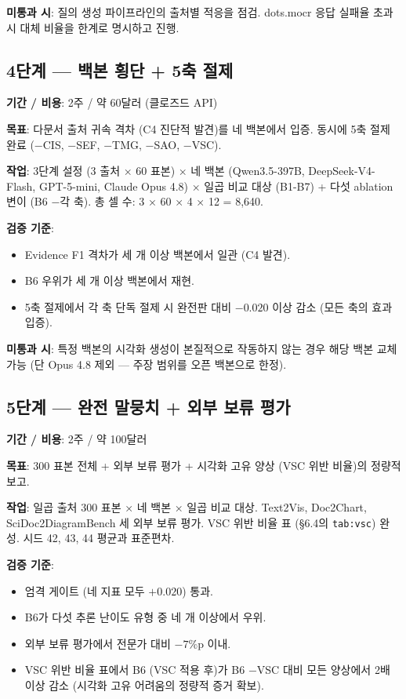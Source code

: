 \documentclass[11pt]{article}
\begin{document}
\textbf{미통과 시}: 질의 생성 파이프라인의 출처별 적응을 점검. dots.mocr 응답 실패율 초과 시 대체 비율을 한계로 명시하고 진행.

\subsection{4단계 — 백본 횡단 + 5축 절제}

\textbf{기간 / 비용}: 2주 / 약 60달러 (클로즈드 API)

\textbf{목표}: 다문서 출처 귀속 격차 (C4 진단적 발견)를 네 백본에서 입증. 동시에 5축 절제 완료 (−CIS, −SEF, −TMG, −SAO, −VSC).

\textbf{작업}: 3단계 설정 (3 출처 × 60 표본) × 네 백본 (Qwen3.5-397B, DeepSeek-V4-Flash, GPT-5-mini, Claude Opus 4.8) × 일곱 비교 대상 (B1-B7) + 다섯 ablation 변이 (B6 −각 축). 총 셀 수: 3 × 60 × 4 × 12 = 8,640.

\textbf{검증 기준}:
\begin{itemize}[leftmargin=*]
    \item Evidence F1 격차가 세 개 이상 백본에서 일관 (C4 발견).
    \item B6 우위가 세 개 이상 백본에서 재현.
    \item 5축 절제에서 각 축 단독 절제 시 완전판 대비 $-0.020$ 이상 감소 (모든 축의 효과 입증).
\end{itemize}

\textbf{미통과 시}: 특정 백본의 시각화 생성이 본질적으로 작동하지 않는 경우 해당 백본 교체 가능 (단 Opus 4.8 제외 — 주장 범위를 오픈 백본으로 한정).

\subsection{5단계 — 완전 말뭉치 + 외부 보류 평가}

\textbf{기간 / 비용}: 2주 / 약 100달러

\textbf{목표}: 300 표본 전체 + 외부 보류 평가 + 시각화 고유 양상 (VSC 위반 비율)의 정량적 보고.

\textbf{작업}: 일곱 출처 300 표본 × 네 백본 × 일곱 비교 대상. Text2Vis, Doc2Chart, SciDoc2DiagramBench 세 외부 보류 평가. VSC 위반 비율 표 (\S 6.4의 \texttt{tab:vsc}) 완성. 시드 42, 43, 44 평균과 표준편차.

\textbf{검증 기준}:
\begin{itemize}[leftmargin=*]
    \item 엄격 게이트 (네 지표 모두 $+0.020$) 통과.
    \item B6가 다섯 추론 난이도 유형 중 네 개 이상에서 우위.
    \item 외부 보류 평가에서 전문가 대비 $-7\%$p 이내.
    \item VSC 위반 비율 표에서 B6 (VSC 적용 후)가 B6 −VSC 대비 모든 양상에서 2배 이상 감소 (시각화 고유 어려움의 정량적 증거 확보).
\end{itemize}
\end{document}
